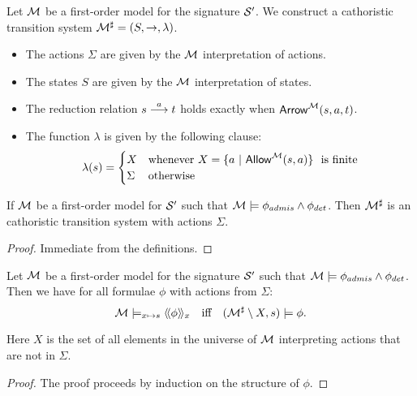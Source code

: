 \begin{definition}
Let $\mathcal{M}$ be a first-order model for the signature $\mathcal{S}'$.
We construct a cathoristic transition system
$\mathcal{M}^{\sharp} = (S, \rightarrow, \lambda)$.
\begin{itemize}

\item The actions $\Sigma$ are given by the $\mathcal{M}$ interpretation of actions.

\item The states $S$ are given by the $\mathcal{M}$ interpretation of states.

\item The reduction relation $s \stackrel{a}{\longrightarrow} t$ holds exactly when
  $\mathsf{Arrow}^{\mathcal{M}}(s, a, t)$.

\item The function $\lambda$ is given by the following clause:
  \[
     \lambda(s) 
        =
     \begin{cases} 
       X & \text{whenever}\ X = \{a \ |\ \ALLOWED{\CAL{M}}{s}{a} \}\ \text{ is finite} \\
       \Sigma & \text{otherwise}
     \end{cases}
  \]

\end{itemize}

\end{definition}

\begin{lemma}
If $\mathcal{M}$ be a first-order model for $\mathcal{S}'$ such that $\mathcal{M}
\models \phi_{admis} \land \phi_{det}$.  Then $\mathcal{M}^{\sharp}$ is an
cathoristic transition system with actions $\Sigma$.
\end{lemma}
\begin{proof}
Immediate from the definitions.
\end{proof}

\begin{theorem}\label{correspondence:theorem:223}
Let $\mathcal{M}$ be a first-order model for the signature $\mathcal{S}'$ such
that $\mathcal{M} \models \phi_{admis} \land \phi_{det}$.  Then we have for
all \cathoristic{} formulae $\phi$ with actions from $\Sigma$:
\[
   \mathcal{M} \models_{x \mapsto s} \langle\!\langle \phi \rangle\!\rangle_x 
        \quad  \text{iff} \quad 
   (\mathcal{M}^{\sharp} \setminus X, s) \models \phi.
\]
\end{theorem}
Here $X$ is the set of all elements in the universe of $\mathcal{M}$ interpreting
actions that are not in $\Sigma$.
\begin{proof}
The proof proceeds by induction on the structure of $\phi$. 
\end{proof}

